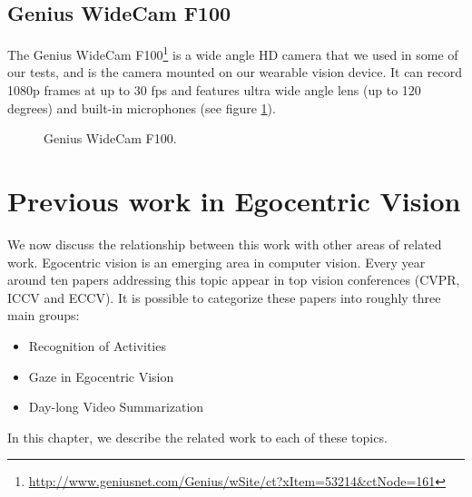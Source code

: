 \subsection{Genius WideCam F100}
The Genius WideCam F100\footnote{\url{http://www.geniusnet.com/Genius/wSite/ct?xItem=53214&ctNode=161}} is a wide angle HD camera that we used in some of our tests, and is the camera mounted on our wearable vision device. It can record 1080p frames at up to 30 fps and features ultra wide angle lens (up to 120 degrees) and built-in microphones (see figure \ref{fig:wide-camera}).

\begin{figure}[tb]
\centering
{}
\caption{Genius WideCam F100.}
\label{fig:wide-camera}
\end{figure}


\section{Previous work in Egocentric Vision}
We now discuss the relationship between this work with other areas of related work. Egocentric vision is an emerging area in computer vision. Every year around ten papers addressing this topic appear in top vision conferences (CVPR, ICCV and ECCV). It is possible to categorize these papers into roughly three main groups:
\begin{itemize}
\item Recognition of Activities
\item Gaze in Egocentric Vision
\item Day-long Video Summarization
\end{itemize}

In this chapter, we describe the related work to each of these topics.



